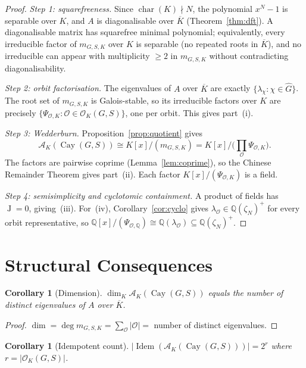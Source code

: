 \documentclass[12pt]{amsart}
\numberwithin{equation}{section}
\theoremstyle{plain}
\newtheorem{corollary}[theorem]{Corollary}
\theoremstyle{definition}
\DeclareMathOperator{\Idem}{Idem}
\DeclareMathOperator{\Jac}{J}
\DeclareMathOperator{\ch}{char}
\DeclareMathOperator{\Cay}{Cay}
\newcommand{\Q}{\mathbb{Q}}
\newcommand{\calA}{\mathcal{A}}
\newcommand{\calO}{\mathcal{O}}
\newcommand{\Ghat}{\widehat{G}}
\begin{document}
\begin{proof}
\emph{Step 1: squarefreeness.}  Since $\ch(K) \nmid N$, the polynomial
$x^N - 1$ is separable over $K$, and $A$ is diagonalisable over
$\overline{K}$ (Theorem~\ref{thm:dft}).  A diagonalisable matrix has
squarefree minimal polynomial; equivalently, every irreducible factor of
$m_{G,S,K}$ over $K$ is separable (no repeated roots in $\overline{K}$),
and no irreducible can appear with multiplicity $\ge 2$ in $m_{G,S,K}$
without contradicting diagonalisability.

\emph{Step 2: orbit factorisation.}  The eigenvalues of $A$ over
$\overline{K}$ are exactly $\{\lambda_\chi : \chi \in \Ghat\}$.  The root
set of $m_{G,S,K}$ is Galois-stable, so its irreducible factors over $K$
are precisely $\{\Psi_{\calO,K} : \calO \in \calO_K(G,S)\}$, one per orbit.
This gives part~(i).

\emph{Step 3: Wedderburn.}  Proposition~\ref{prop:quotient} gives
\[
\calA_K(\Cay(G,S)) \cong K[x]/(m_{G,S,K})
= K[x]/\!\bigl(\prod_\calO \Psi_{\calO,K}\bigr).
\]
The factors are pairwise coprime
(Lemma~\ref{lem:coprime}), so the Chinese Remainder Theorem gives part~(ii).
Each factor $K[x]/(\Psi_{\calO,K})$ is a field.

\emph{Step 4: semisimplicity and cyclotomic containment.}  A product of
fields has $\Jac = 0$, giving~(iii).  For~(iv), Corollary~\ref{cor:cyclo}
gives $\lambda_\calO \in \Q(\zeta_N)^+$ for every orbit representative, so
$\Q[x]/(\Psi_{\calO,\Q}) \cong \Q(\lambda_\calO) \subseteq \Q(\zeta_N)^+$.
\end{proof}

\section{Structural Consequences}
\label{sec:struct}

\begin{corollary}[Dimension]
\label{cor:dim}
$\dim_K \calA_K(\Cay(G,S))$ equals the number of distinct eigenvalues of
$A$ over $\overline{K}$.
\end{corollary}

\begin{proof}
$\dim = \deg m_{G,S,K} = \sum_{\calO} |\calO|
= $ number of distinct eigenvalues.
\end{proof}

\begin{corollary}[Idempotent count]
\label{cor:idem}
$|\Idem(\calA_K(\Cay(G,S)))| = 2^r$ where $r = |\calO_K(G,S)|$.
\end{corollary}
\end{document}
